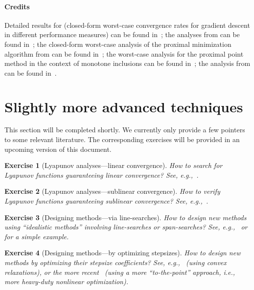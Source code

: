 \documentclass[11pt,a4paper]{article}
\newtheorem{exercise}{Exercise}
\begin{document}
	
\paragraph{Credits} Detailed results for  (closed-form worst-case convergence rates for gradient descent in different performance measures) can be found in~\cite{taylor2015exact}; the analyses from  can be found in~\cite{lieder2017convergence}; the closed-form worst-case analysis of the proximal minimization algorithm from  can be found in~\cite{taylor2018exact}; the worst-case analysis for the proximal point method in the context of monotone inclusions can be found in~\cite{gu2020tight}; the analysis from  can be found in~\cite{giselsson2016linear}.

		

	\section{Slightly more advanced techniques}\label{s:adv}		%

	This section will be completed shortly. We currently only provide a few pointers to some relevant literature. The corresponding exercises will be provided in an upcoming version of this document.
	
	\begin{exercise}[Lyapunov analyses---linear convergence] How to search for Lyapunov functions guaranteeing linear convergence? See, e.g.,~\cite{lessard2014analysis,taylor2018lyapunov}.
	\end{exercise}
	
	\begin{exercise}[Lyapunov analyses---sublinear convergence] How to verify Lyapunov functions guaranteeing sublinear convergence?  See, e.g.,~\cite{pmlr-v99-taylor19a}.
	\end{exercise}
	
	
	
	\begin{exercise}[Designing methods---via line-searches] How to design new methods using ``idealistic methods'' involving line-searches or span-searches? See, e.g.,~\cite{drori2018efficient} or~\cite{goujaud2022optimal} for a simple example. 
	\end{exercise}
	
	
	\begin{exercise}[Designing methods---by optimizing stepsizes] How to design new methods by optimizing their stepsize coefficients? See, e.g.,~\cite{kim2014optimized,kim2018optimizing,van2018fastest,kim2019accelerated,taylor2022optimal} (using convex relaxations), or the more recent~\cite{gupta2022branch} (using a more ``to-the-point'' approach, i.e., more heavy-duty nonlinear optimization).
	\end{exercise}
	
\end{document}
